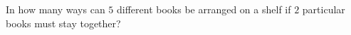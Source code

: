 In how many ways can $5$ different books be arranged on a shelf if $2$ particular books must stay together?

